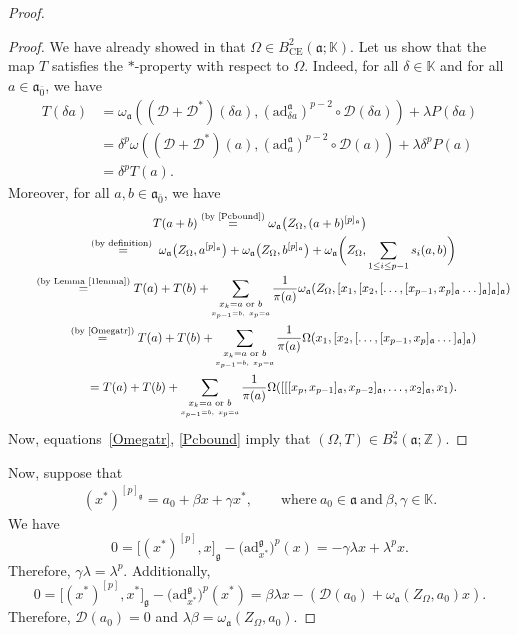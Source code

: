 \documentclass[10pt,a4paper]{amsart}
\numberwithin{equation}{section}
\begin{document}
\begin{proof}
\begin{proof}
We have already showed in \cite{BM} that $\Omega \in B^2_{\text{CE}}(\mathfrak{a}; \mathbb K)$. Let us show that the
map $T$ satisfies the $*$-property with respect to $\Omega$. Indeed, for all $\delta \in \mathbb K$ and for all $a\in \mathfrak{a}_{\bar 0}$, we have
\begin{align*}
T(\delta a) & = \omega_\mathfrak{a} (({\mathscr D}+{\mathscr D}^*)(\delta a),(\mathrm{ad}_{\delta a}^\mathfrak{a})^{p-2} \circ {\mathscr D}(\delta a)) + \lambda P(\delta a) \\
 & = \delta^p \omega (({\mathscr D}+{\mathscr D}^*)(a),(\mathrm{ad}_{ a}^\mathfrak{a})^{p-2} \circ {\mathscr D}(a)) + \lambda \delta^p P(a) \\
 & =\delta^p T(a).
\end{align*}
Moreover, for all $a,b\in \mathfrak{a}_{\bar 0}$, we have
\begin{gather*}
T(a+b) \overset{\text{(by~\eqref{Pcbound})}}{=} \omega_\mathfrak{a}\bigl(Z_\Omega, (a+b)^{[p]_\mathfrak{a}}\bigr)\\
\qquad{}\overset{\text{(by definition) }}{=} \omega_\mathfrak{a}\bigl(Z_\Omega, a^{[p]_\mathfrak{a}}\bigr) + \omega_\mathfrak{a}\bigl(Z_\Omega, b^{[p]_\mathfrak{a}}\bigr)+ \omega_\mathfrak{a}\bigg(Z_\Omega, \sum_{1\leq i \leq p-1}s_i(a,b) \bigg) \\
\qquad{} \overset{\text{(by Lemma \ref{1lemma})}}{=}{} T(a)+T(b)
 + \sum_{\underset{x_{p-1}=b,~x_p=a}{x_k=a \text{ or } b}}\frac{1}{\pi(a)} \omega_\mathfrak{a}(Z_\Omega, [x_1,[x_2,[\dots ,[x_{p-1},x_p]_\mathfrak{a}\dots ]_\mathfrak{a}]_\mathfrak{a}]_\mathfrak{a}) \\
\qquad{}\overset{\text{(by~\eqref{Omegatr})}}{=} T(a)+T(b) + \sum_{\underset{x_{p-1}=b,~x_p=a}{x_k=a \text{ or } b}}\frac{1}{\pi(a)} \Omega ( x_1,[x_2,[\dots ,[x_{p-1},x_p]_\mathfrak{a}\dots ]_\mathfrak{a}]_\mathfrak{a}) \\
\qquad{} = T(a)+T(b) + \sum_{\underset{x_{p-1}=b,~x_p=a}{x_k=a \text{ or } b}}\frac{1}{\pi(a)} \Omega ( [[[x_p,x_{p-1}]_\mathfrak{a},x_{p-2}]_\mathfrak{a},\dots ,x_2]_\mathfrak{a}, x_1).
\end{gather*}
Now, equations~\eqref{Omegatr}, \eqref{Pcbound} imply that $(\Omega, T)\in B^2_*(\mathfrak{a}; \mathbb Z)$.
\end{proof}


Now, suppose that
\begin{gather*}%
(x^*)^{[p]_\mathfrak{g}}=a_0+\beta x+\gamma x^*,\qquad \text{where}\ a_0\in \mathfrak{a} \ \text{and}\ \beta, \gamma \in \mathbb{K}.
\end{gather*}
We have
\[
0=\big[(x^*)^{[p]},x\big]_\mathfrak{g}-\bigl(\mathrm{ad}_{x^*}^\mathfrak{g}\bigr)^p(x)= -\gamma \lambda x+ \lambda^px.
\]
Therefore, $\gamma \lambda= \lambda^p$. Additionally,
\[
0=\big[(x^*)^{[p]},x^*\big]_\mathfrak{g}-\bigl(\mathrm{ad}_{x^*}^\mathfrak{g}\bigr)^p(x^*)= \beta \lambda x- ({\mathscr D}(a_0)+\omega_\mathfrak{a} (Z_\Omega, a_0)x).
\]
Therefore, ${\mathscr D}(a_0)=0$ and $\lambda \beta= \omega_\mathfrak{a} (Z_\Omega, a_0)$.


\end{proof}
\end{document}

